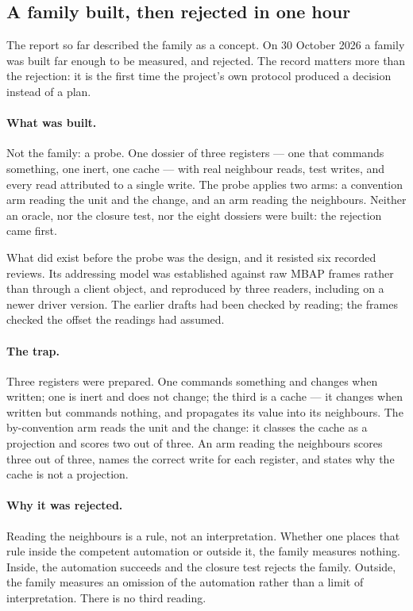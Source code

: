 \subsection{A family built, then rejected in one hour}

The report so far described the family as a concept. On 30 October 2026 a
family was built far enough to be measured, and rejected. The record matters
more than the rejection: it is the first time the project's own protocol
produced a decision instead of a plan.

\paragraph{What was built.} Not the family: a probe. One dossier of three
registers --- one that commands something, one inert, one cache --- with real
neighbour reads, test writes, and every read attributed to a single write. The
probe applies two arms: a convention arm reading the unit and the change, and an
arm reading the neighbours. Neither an oracle, nor the closure test, nor the
eight dossiers were built: the rejection came first.

What did exist before the probe was the design, and it resisted six recorded
reviews. Its addressing model was established against raw MBAP frames rather
than through a client object, and reproduced by three readers, including on a
newer driver version. The earlier drafts had been checked by reading; the frames
checked the offset the readings had assumed.

\paragraph{The trap.} Three registers were prepared. One commands something and
changes when written; one is inert and does not change; the third is a cache ---
it changes when written but commands nothing, and propagates its value into its
neighbours. The by-convention arm reads the unit and the change: it classes the
cache as a projection and scores two out of three. An arm reading the neighbours
scores three out of three, names the correct write for each register, and states
why the cache is not a projection.

\paragraph{Why it was rejected.} Reading the neighbours is a rule, not an
interpretation. Whether one places that rule inside the competent automation or
outside it, the family measures nothing. Inside, the automation succeeds and the
closure test rejects the family. Outside, the family measures an omission of the
automation rather than a limit of interpretation. There is no third reading.

